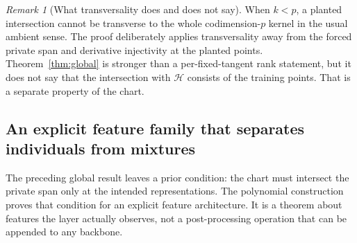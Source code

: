 \documentclass[11pt,a4paper]{article}
\theoremstyle{definition}
\theoremstyle{definition}
\theoremstyle{remark}\newtheorem{remark}[theorem]{Remark}
\newcommand{\HH}{\mathcal H}\newcommand{\XX}{\mathcal X}\newcommand{\col}{\operatorname{col}}
\begin{document}
\begin{remark}[What transversality does and does not say]
When $k<p$, a planted intersection cannot be transverse to the whole codimension-$p$ kernel in the usual ambient sense. The proof deliberately applies transversality away from the forced private span and derivative injectivity at the planted points. Theorem~\ref{thm:global} is stronger than a per-fixed-tangent rank statement, but it does not say that the intersection with $\HH$ consists of the training points. That is a separate property of the chart.
\end{remark}

\subsection{An explicit feature family that separates individuals from mixtures}

The preceding global result leaves a prior condition: the chart must intersect the private span only at the intended representations. The polynomial construction proves that condition for an explicit feature architecture. It is a theorem about features the layer actually observes, not a post-processing operation that can be appended to any backbone.
\end{document}
